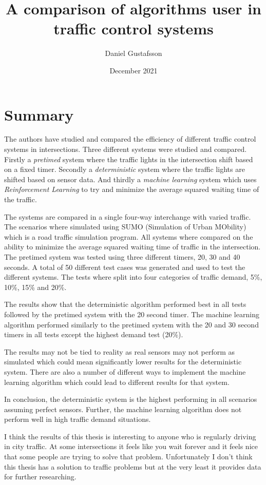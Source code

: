 \documentclass[10pt, a4paper]{article}
\title{A comparison of algorithms user in traffic control systems}
\author{Daniel Gustafsson}
\date{December 2021}
\begin{document}
\maketitle

\section{Summary}
The authors have studied and compared the efficiency of different traffic control systems in intersections.
Three different systems were studied and compared. Firstly a \textit{pretimed} system where the traffic lights
in the intersection shift based on a fixed timer. Secondly a \textit{deterministic} system where the traffic lights
are shifted based on sensor data. And thirdly a \textit{machine learning} system which uses \textit{Reinforcement Learning}
to try and minimize the average squared waiting time of the traffic.

The systems are compared in a single four-way interchange with varied traffic. The scenarios where simulated using SUMO
(Simulation of Urban MObility) which is a road traffic simulation program. All systems where compared on the ability to
minimize the average squared waiting time of traffic in the intersection. The pretimed system was tested using three different
timers, 20, 30 and 40 seconds. A total of 50 different test cases was generated and used to test the different systems.
The tests where split into four categories of traffic demand, 5\%, 10\%, 15\% and 20\%.

The results show that the deterministic algorithm performed best in all tests followed by the pretimed system with the 20 second
timer. The machine learning algorithm performed similarly to the pretimed system with the 20 and 30 second timers in all tests
except the highest demand test (20\%).

The results may not be tied to reality as real sensors may not perform as simulated which could mean significantly lower results
for the deterministic system. There are also a number of different ways to implement the machine learning algorithm which could
lead to different results for that system.

In conclusion, the deterministic system is the highest performing in all scenarios assuming perfect sensors. Further, the
machine learning algorithm does not perform well in high traffic demand situations. 

I think the results of this thesis is interesting to anyone who is regularly driving in city traffic. At some intersections it feels
like you wait forever and it feels nice that some people are trying to solve that problem. Unfortunately I don't think this thesis
has a solution to traffic problems but at the very least it provides data for further researching.
\end{document}
